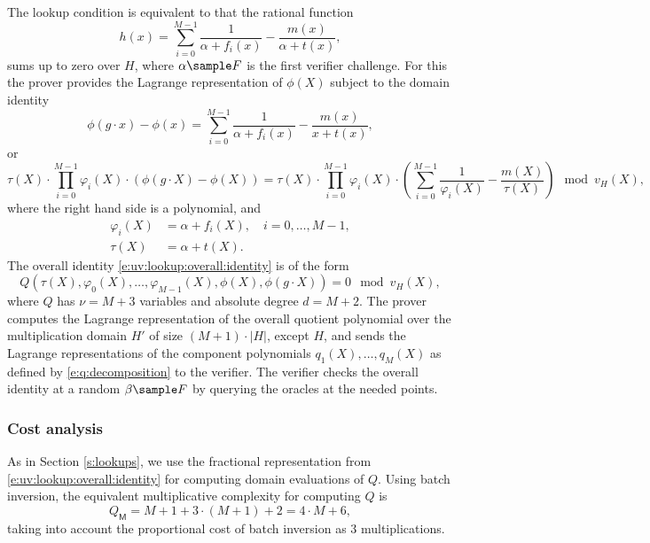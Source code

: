 \documentclass[11pt]{article}
\theoremstyle{definition}
\theoremstyle{remark}
\begin{document}
The lookup condition is equivalent to that the rational function
\begin{equation}
\label{e:lookup:h}
h(x) = \sum_{i=0}^{M-1} \frac{1}{\alpha + f_i(x)} - \frac{m(x)}{\alpha + t(x)},
\end{equation}
sums up to zero over $H$, where $\alpha\sample F$ is the first verifier challenge.
For this the prover provides the Lagrange representation of $\phi(X)$ subject to the domain identity
\[
\phi(g\cdot x) - \phi(x) = \sum_{i=0}^{M-1} \frac{1}{\alpha + f_i(x)} - \frac{m(x)}{x + t(x)},
\]
or 
\begin{equation}
\label{e:uv:lookup:overall:identity}
 \tau(X) \cdot
\prod_{i=0}^{M-1} \varphi_i(X) \cdot (\phi(g\cdot X) - \phi(X))= 
 \tau(X) \cdot \prod_{i=0}^{M-1} \varphi_i(X)\cdot \left(\sum_{i=0}^{M-1} \frac{1}{\varphi_i(X)} - \frac{m(X)}{\tau(X)}\right) \mod v_H(X),
\end{equation}
where the right hand side is a polynomial, and 
\begin{align*}
\varphi_i(X) &= \alpha + f_i(X), \quad i=0,\ldots, M-1,
\\
 \tau(X) &= \alpha + t(X).
\end{align*}
The overall identity \eqref{e:uv:lookup:overall:identity} is of the form
\[
Q(\tau(X), \varphi_0(X), \ldots, \varphi_{M-1}(X), \phi(X), \phi(g\cdot X)) = 0 \mod v_H(X),
\]
where $Q$ has $\nu = M + 3$ variables and absolute degree $d= M + 2$. 
The prover computes the Lagrange representation of the overall quotient polynomial over the multiplication domain $H'$ of size $(M + 1)\cdot |H|$, except $H$,
and sends the Lagrange representations of the component polynomials $q_1(X),\ldots, q_{M}(X)$ as defined by \eqref{e:q:decomposition} to the verifier.
The verifier checks the overall identity at a random $\beta\sample F$ by querying the oracles at the needed points.

\subsubsection*{Cost analysis}

As in Section \ref{s:lookups}, we use the fractional representation from \eqref{e:uv:lookup:overall:identity} for computing domain evaluations of $Q$. 
Using batch inversion, the equivalent multiplicative complexity for computing $Q$ is 
\[
Q_\mathsf M = M + 1 + 3\cdot (M+1) + 2 = 4\cdot M + 6,
\] 
taking into account the proportional cost of batch inversion as $3$ multiplications.  
\end{document}
